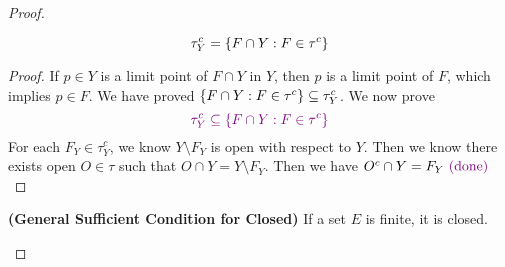 \documentclass{report}
\begin{document}
\begin{proof}
\begin{corollary}
\begin{equation}
\tau^c_Y=\{ F\cap Y:F\in \tau^c \}
\end{equation}
\end{corollary}
\begin{proof}
If $p\in Y$ is a limit point of $F\cap Y$ in $Y$, then  $p$ is a limit point of $F$, which implies  $p\in F$. We have proved $\{ F\cap Y:F\in \tau^c \}\subseteq \tau_Y^c$. We now prove
\begin{equation}
\textcolor{violet}{ \tau_Y^c\subseteq \{ F\cap Y:F\in \tau^c \}}
\end{equation}
For each $F_Y\in \tau_Y^c$, we know $Y\setminus F_Y$ is open with respect to $Y$. Then we know there exists open $O\in\tau$ such that $O\cap Y=Y\setminus F_Y$. Then we have $O^c \cap Y=F_Y\textcolor{violet}{\text{ (done) }}$
\end{proof}
\begin{theorem}
\label{1.6.11}
\textbf{(General Sufficient Condition for Closed)} If a set $E$ is finite, it is closed.
\end{theorem}

\end{proof}
\end{document}
